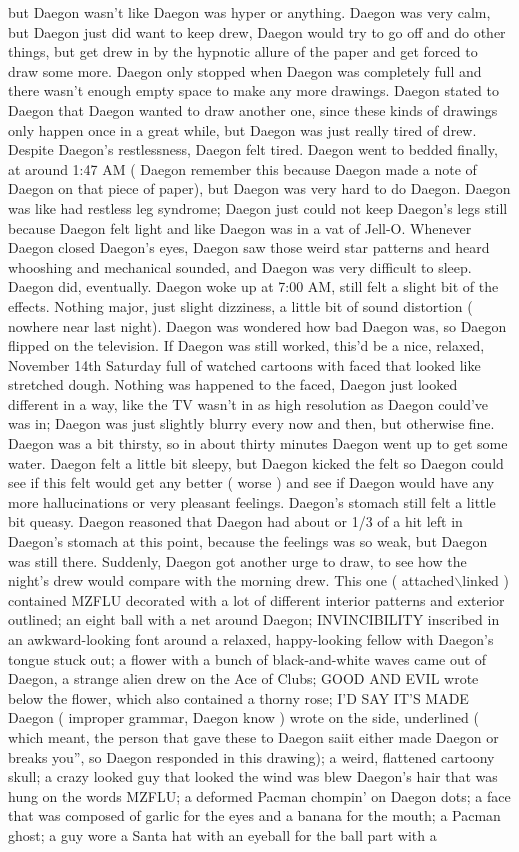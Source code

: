 \documentclass[12pt]{book}
\begin{document}
but Daegon wasn't like Daegon was hyper or anything. Daegon was very calm, but Daegon just did want to keep drew, Daegon would try to go off and do other things, but get drew in by the hypnotic allure of the paper and get forced to draw some more. Daegon only stopped when Daegon was completely full and there wasn't enough empty space to make any more drawings. Daegon stated to Daegon that Daegon wanted to draw another one, since these kinds of drawings only happen once in a great while, but Daegon was just really tired of drew. Despite Daegon's restlessness, Daegon felt tired. Daegon went to bedded finally, at around 1:47 AM ( Daegon remember this because Daegon made a note of Daegon on that piece of paper), but Daegon was very hard to do Daegon. Daegon was like had restless leg syndrome; Daegon just could not keep Daegon's legs still because Daegon felt light and like Daegon was in a vat of Jell-O. Whenever Daegon closed Daegon's eyes, Daegon saw those weird star patterns and heard whooshing and mechanical sounded, and Daegon was very difficult to sleep. Daegon did, eventually. Daegon woke up at 7:00 AM, still felt a slight bit of the effects. Nothing major, just slight dizziness, a little bit of sound distortion ( nowhere near last night). Daegon was wondered how bad Daegon was, so Daegon flipped on the television. If Daegon was still worked, this'd be a nice, relaxed, November 14th Saturday full of watched cartoons with faced that looked like stretched dough. Nothing was happened to the faced, Daegon just looked different in a way, like the TV wasn't in as high resolution as Daegon could've was in; Daegon was just slightly blurry every now and then, but otherwise fine. Daegon was a bit thirsty, so in about thirty minutes Daegon went up to get some water. Daegon felt a little bit sleepy, but Daegon kicked the felt so Daegon could see if this felt would get any better ( worse ) and see if Daegon would have any more hallucinations or very pleasant feelings. Daegon's stomach still felt a little bit queasy. Daegon reasoned that Daegon had about  or 1/3 of a hit left in Daegon's stomach at this point, because the feelings was so weak, but Daegon was still there. Suddenly, Daegon got another urge to draw, to see how the night's drew would compare with the morning drew. This one ( attached$\backslash$linked ) contained MZFLU decorated with a lot of different interior patterns and exterior outlined; an eight ball with a net around Daegon; INVINCIBILITY inscribed in an awkward-looking font around a relaxed, happy-looking fellow with Daegon's tongue stuck out; a flower with a bunch of black-and-white waves came out of Daegon, a strange alien drew on the Ace of Clubs; GOOD AND EVIL wrote below the flower, which also contained a thorny rose; I'D SAY IT'S MADE Daegon ( improper grammar, Daegon know ) wrote on the side, underlined ( which meant, the person that gave these to Daegon saiit either made Daegon or breaks you'', so Daegon responded in this drawing); a weird, flattened cartoony skull; a crazy looked guy that looked the wind was blew Daegon's hair that was hung on the words MZFLU; a deformed Pacman chompin' on Daegon dots; a face that was composed of garlic for the eyes and a banana for the mouth; a Pacman ghost; a guy wore a Santa hat with an eyeball for the ball part with a 
\end{document}

